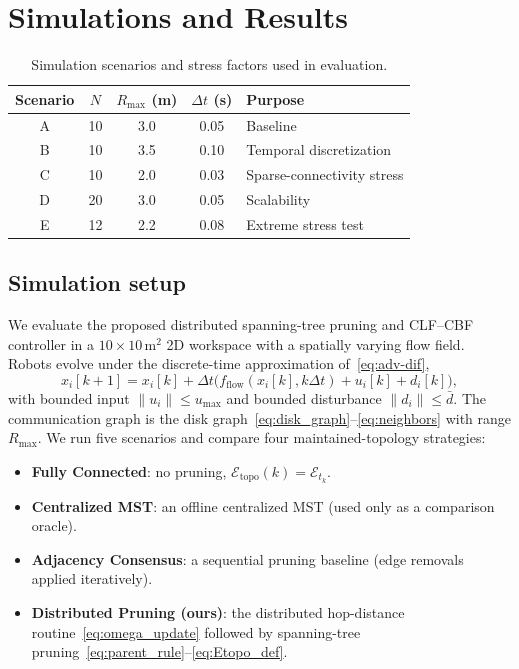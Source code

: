 \documentclass[conference]{IEEEconf}
\theoremstyle{plain}
\begin{document}
\section{Simulations and Results}
\label{sec:experiments}

\begin{table}[t]
\centering
\caption{Simulation scenarios and stress factors used in evaluation.}
\label{tab:scenarios}
\setlength{\tabcolsep}{5pt}
\footnotesize
\begin{tabular}{ccccp{}}
\toprule
\textbf{Scenario} & \textbf{$N$} & \textbf{$R_{\max}$ (m)} & \textbf{$\Delta t$ (s)} & \textbf{Purpose} \\
\midrule
A & 10 & 3.0 & 0.05 & Baseline \\
B & 10 & 3.5 & 0.10 & Temporal discretization \\
C & 10 & 2.0 & 0.03 & Sparse-connectivity stress\\
D & 20 & 3.0 & 0.05 & Scalability \\
E & 12 & 2.2 & 0.08 & Extreme stress test\\
\bottomrule
\end{tabular}
\end{table}
\FloatBarrier

\subsection{Simulation setup}
\label{subsec:sim_setup_new}

We evaluate the proposed distributed spanning-tree pruning and CLF--CBF controller in a $10\times 10$\,m$^2$ 2D workspace with a spatially varying flow field.
Robots evolve under the discrete-time approximation of~\eqref{eq:adv-dif},
\begin{equation}
x_i[k{+}1]
=
x_i[k]
+
\Delta t\Big(f_{\mathrm{flow}}(x_i[k],k\Delta t) + u_i[k] + d_i[k]\Big),
\label{eq:sim_euler}
\end{equation}
with bounded input $\|u_i\|\le u_{\max}$ and bounded disturbance $\|d_i\|\le \bar d$.
The communication graph is the disk graph~\eqref{eq:disk_graph}--\eqref{eq:neighbors} with range $R_{\max}$.
We run five scenarios and compare four maintained-topology strategies:
\begin{itemize}
  \item \textbf{Fully Connected}: no pruning, $\mathcal{E}_{\mathrm{topo}}(k)=\mathcal{E}_{t_k}$.
  \item \textbf{Centralized MST}: an offline centralized MST (used only as a comparison oracle).
  \item \textbf{Adjacency Consensus}: a sequential pruning baseline (edge removals applied iteratively).
  \item \textbf{Distributed Pruning (ours)}: the distributed hop-distance routine~\eqref{eq:omega_update} followed by spanning-tree pruning~\eqref{eq:parent_rule}--\eqref{eq:Etopo_def}.
\end{itemize}
\end{document}
